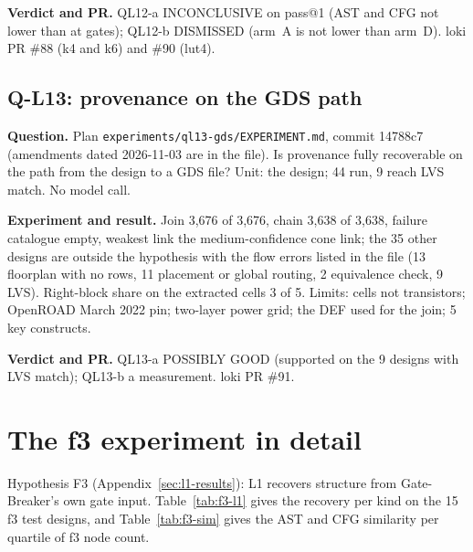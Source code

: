 \documentclass[conference]{IEEEtran}
\newcommand{\hev}[1]{\par\smallskip\noindent\textbf{#1}}
\newcommand{\code}[1]{\texttt{#1}}
\begin{document}
\hev{Verdict and PR.} QL12-a INCONCLUSIVE on pass@1 (AST and CFG not lower than at gates); QL12-b DISMISSED (arm~A is not lower than arm~D). loki PR \#88 (k4 and k6) and \#90 (lut4).

\subsection{Q-L13: provenance on the GDS path}
\label{rec:ql13}

\hev{Question.} Plan \code{experiments/}\allowbreak\code{ql13-gds/EXPERIMENT.md}, commit 14788c7 (amendments dated 2026-11-03 are in the file). Is provenance fully recoverable on the path from the design to a GDS file? Unit: the design; 44 run, 9 reach LVS match. No model call.

\hev{Experiment and result.} Join 3,676 of 3,676, chain 3,638 of 3,638, failure catalogue empty, weakest link the medium-confidence cone link; the 35 other designs are outside the hypothesis with the flow errors listed in the file (13 floorplan with no rows, 11 placement or global routing, 2 equivalence check, 9 LVS). Right-block share on the extracted cells 3 of 5. Limits: cells not transistors; OpenROAD March 2022 pin; two-layer power grid; the DEF used for the join; 5 key constructs.

\hev{Verdict and PR.} QL13-a POSSIBLY GOOD (supported on the 9 designs with LVS match); QL13-b a measurement. loki PR \#91.

\section{The f3 experiment in detail}
\label{app:f3}

Hypothesis F3 (Appendix~\ref{sec:l1-results}): L1 recovers structure from Gate-Breaker's own gate input.
Table~\ref{tab:f3-l1} gives the recovery per kind on the 15 f3 test designs, and Table~\ref{tab:f3-sim} gives
the AST and CFG similarity per quartile of f3 node count.
\end{document}
